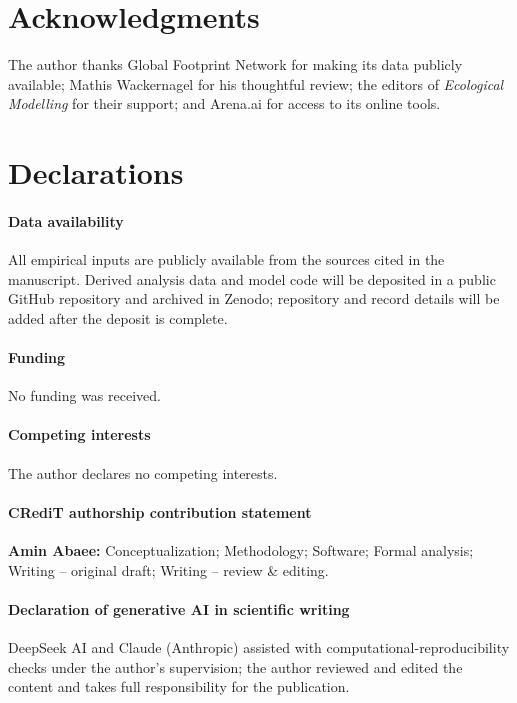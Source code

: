 \section*{Acknowledgments}

The author thanks Global Footprint Network for making its data publicly available; Mathis Wackernagel for his thoughtful review; the editors of \emph{Ecological Modelling} for their support; and Arena.ai for access to its online tools.

\section*{Declarations}

\paragraph{Data availability} All empirical inputs are publicly available from the sources cited in the manuscript. Derived analysis data and model code will be deposited in a public GitHub repository and archived in Zenodo; repository and record details will be added after the deposit is complete.

\paragraph{Funding} No funding was received.

\paragraph{Competing interests} The author declares no competing interests.

\paragraph{CRediT authorship contribution statement} \textbf{Amin Abaee:} Conceptualization; Methodology; Software; Formal analysis; Writing -- original draft; Writing -- review \& editing.

\paragraph{Declaration of generative AI in scientific writing} DeepSeek AI and Claude (Anthropic) assisted with computational-reproducibility checks under the author's supervision; the author reviewed and edited the content and takes full responsibility for the publication.
